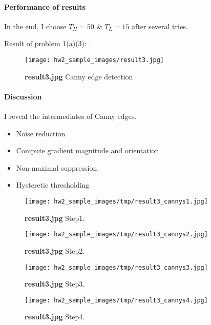 \paragraph{Performance of results}
In the end, I choose $T_{H}=50$ \& $T_{L}=15$ after several tries.

Result of problem 1(a)(3): .
\begin{figure}
    \centering
    \texttt{[image: hw2\_sample\_images/result3.jpg]}
    \caption{\textbf{result3.jpg} Canny edge detection}
    \label{result3}
\end{figure}

\paragraph{Discussion}
I reveal the intermediates of Canny edges.
\begin{itemize}
    \item {} Noise reduction 
    \item {} Compute gradient magnitude and orientation
    \item {} Non-maximal suppression
    \item {} Hysteretic thresholding
\end{itemize}
\begin{figure}
    \centering
    \texttt{[image: hw2\_sample\_images/tmp/result3\_cannys1.jpg]}
    \caption{\textbf{result3.jpg} Step1.}
    \label{result3_cannys1}
\end{figure}

\begin{figure}
    \centering
    \texttt{[image: hw2\_sample\_images/tmp/result3\_cannys2.jpg]}
    \caption{\textbf{result3.jpg} Step2.}
    \label{result3_cannys2}
\end{figure}

\begin{figure}
    \centering
    \texttt{[image: hw2\_sample\_images/tmp/result3\_cannys3.jpg]}
    \caption{\textbf{result3.jpg} Step3.}
    \label{result3_cannys3}
\end{figure}

\begin{figure}
    \centering
    \texttt{[image: hw2\_sample\_images/tmp/result3\_cannys4.jpg]}
    \caption{\textbf{result3.jpg} Step4.}
    \label{result3_cannys4}
\end{figure}

